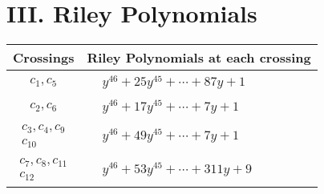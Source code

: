 \documentclass[1p]{elsarticle_modified}
\theoremstyle{definition}
\begin{document}
\centering \section*{ III. Riley Polynomials}
\begin{tabular}{m{50pt}|m{274pt}}
Crossings & \hspace{64pt}Riley Polynomials at each crossing \\
\hline $$\begin{aligned}c_{1},c_{5}\end{aligned}$$&$\begin{aligned}
&y^{46}+25 y^{45}+\cdots+87 y+1
\end{aligned}$\\
\hline $$\begin{aligned}c_{2},c_{6}\end{aligned}$$&$\begin{aligned}
&y^{46}+17 y^{45}+\cdots+7 y+1
\end{aligned}$\\
\hline $$\begin{aligned}c_{3},c_{4},c_{9}\\c_{10}\end{aligned}$$&$\begin{aligned}
&y^{46}+49 y^{45}+\cdots+7 y+1
\end{aligned}$\\
\hline $$\begin{aligned}c_{7},c_{8},c_{11}\\c_{12}\end{aligned}$$&$\begin{aligned}
&y^{46}+53 y^{45}+\cdots+311 y+9
\end{aligned}$\\
\hline
\end{tabular}
\vskip 2pc
\end{document}
